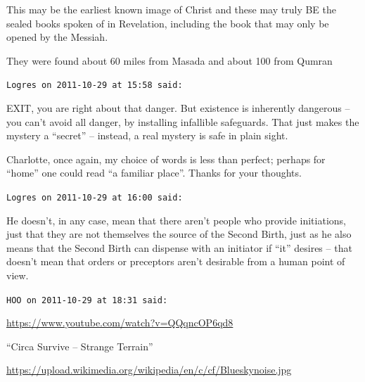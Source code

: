 \begin{footnotesize}
\begin{sffamily}
This may be the earliest known image of Christ and these may truly BE the sealed books spoken of in Revelation, including the book that may only be opened by the Messiah.

They were found about 60 miles from Masada and about 100 from Qumran

\hfill

\texttt{Logres on 2011-10-29 at 15:58 said:}

EXIT, you are right about that danger. But existence is inherently dangerous -- you can't avoid all danger, by installing infallible safeguards. That just makes the mystery a ``secret'' -- instead, a real mystery is safe in plain sight.

Charlotte, once again, my choice of words is less than perfect; perhaps for ``home'' one could read ``a familiar place''. Thanks for your thoughts.

\hfill

\texttt{Logres on 2011-10-29 at 16:00 said:}

He doesn't, in any case, mean that there aren't people who provide initiations, just that they are not themselves the source of the Second Birth, just as he also means that the Second Birth can dispense with an initiator if ``it'' desires -- that doesn't mean that orders or preceptors aren't desirable from a human point of view.

\hfill

\texttt{HOO on 2011-10-29 at 18:31 said:}

\url{https://www.youtube.com/watch?v=QQqncOP6qd8}

``Circa Survive -- Strange Terrain''

\url{https://upload.wikimedia.org/wikipedia/en/c/cf/Blueskynoise.jpg}

\hfill

\end{sffamily}
\end{footnotesize}

